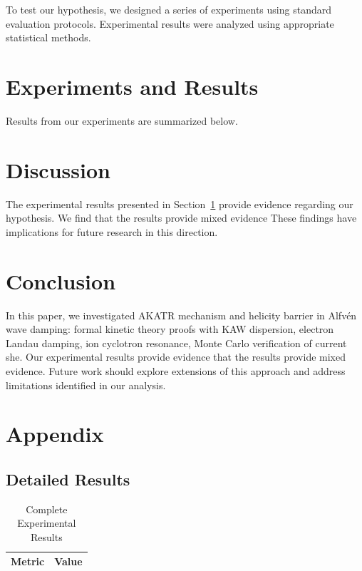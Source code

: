 \documentclass{article}
\begin{document}
To test our hypothesis, we designed a series of experiments using standard evaluation protocols. Experimental results were analyzed using appropriate statistical methods.

\section{Experiments and Results}

\label{sec:results}

Results from our experiments are summarized below.

\section{Discussion}

The experimental results presented in Section~\ref{sec:results} provide evidence regarding our hypothesis. We find that the results provide mixed evidence These findings have implications for future research in this direction.

\section{Conclusion}

In this paper, we investigated AKATR mechanism and helicity barrier in Alfvén wave damping: formal kinetic theory proofs with KAW dispersion, electron Landau damping, ion cyclotron resonance, Monte Carlo verification of current she. Our experimental results provide evidence that the results provide mixed evidence. Future work should explore extensions of this approach and address limitations identified in our analysis.

\appendix

\section{Appendix}

\subsection{Detailed Results}

\begin{table}[htbp]
\centering
\caption{Complete Experimental Results}
\begin{tabular}{lc}
\toprule
Metric & Value \\
\midrule
\bottomrule
\end{tabular}
\end{table}




\end{document}
